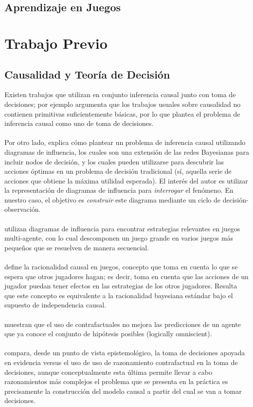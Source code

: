 \documentclass[11pt]{article}
\theoremstyle{plain}
\begin{document}
\subsection{Aprendizaje en Juegos}
\section{Trabajo Previo}
\subsection{Causalidad y Teoría de Decisión}
Existen trabajos que utilizan en conjunto inferencia causal junto con toma de decisiones; por ejemplo \cite{heckerman1995decision} argumenta que los trabajos usuales sobre causalidad no contienen primitivas suficientemente básicas, por lo que plantea el problema de inferencia causal como uno de toma de decisiones.\\
\\
\indent Por otro lado, \cite{dawid2002influence} explica cómo plantear un problema de inferencia causal utilizando diagramas de influencia, los cuales son una extensión de las redes Bayesianas para incluir nodos de decisión, y los cuales pueden utilizarse para descubrir las acciones óptimas en un problema de decisión tradicional (sí, aquella serie de acciones que obtiene la máxima utilidad esperada). El interés del autor es utilizar la representación de diagramas de influencia para \textit{interrogar} el fenómeno. En nuestro caso, el objetivo es \textit{construir} este diagrama mediante un ciclo de decisión-observación.\\
\\
\indent \cite{koller2003multi} utilizan diagramas de influencia para encontrar estrategias relevantes en juegos multi-agente, con lo cual descomponen un juego grande en varios juegos más pequeños que se resuelven de manera secuencial.\\
\\
\indent \cite{board2006equivalence} define la racionalidad causal en juegos, concepto que toma en cuenta lo que se espera que otros jugadores hagan; es decir, toma en cuenta que las acciones de un jugador puedan tener efectos en las estrategias de los otros jugadores. Resulta que este concepto es equivalente a la racionalidad bayesiana estándar bajo el supuesto de independencia causal.\\
\\
\cite{di2013predictive} muestran que el uso de contrafactuales no mejora las predicciones de un agente que ya conoce el conjunto de hipótesis posibles (logically omniscient).\\
\\
\indent \cite{soares2015toward} compara, desde un punto de vista epistemológico, la toma de decisiones apoyada en evidencia versus el uso de uso de razonamiento contrafactual en la toma de decisiones, aunque conceptualmente esta última permite llevar a cabo razonamientos más complejos el problema que se presenta en la práctica es precisamente la construcción del modelo causal a partir del cual se van a tomar decisiones.
\end{document}

